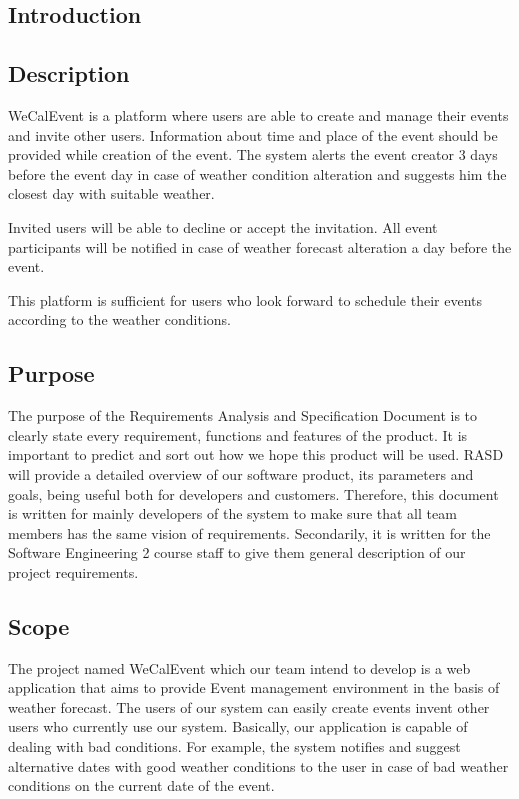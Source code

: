 \newpage
\begin{center}
\section{Introduction}
\end{center}

\subsection{Description}
\quad WeCalEvent is a platform where users are able to create and manage their events and invite other users. Information about time and place of the event should be provided while creation of the event. The system alerts the event creator 3 days before the event day in case of weather condition alteration and suggests him the closest day with suitable weather.
\par Invited users will be able to decline or accept the invitation. All event participants will be notified in case of weather forecast alteration a day before the event.
\par This platform is sufficient for users who look forward to schedule their events according to the weather conditions.

\subsection{Purpose}
\quad The purpose of the Requirements Analysis and Specification Document is to clearly state every requirement, functions and features of the product. It is important to predict and sort out how we hope this product will be used. RASD will provide a detailed overview of our software product, its parameters and goals, being useful both for developers and customers. Therefore, this document is written for mainly developers of the system to make sure that all team members has the same vision of requirements. Secondarily, it is written for the Software Engineering 2 course staff to give them general description of our project requirements.

\subsection{Scope}
\quad The project named WeCalEvent which our team intend to develop is a web application that aims to provide Event management environment in the basis of weather forecast. The users of our system can easily create events invent other users who currently use our system. Basically, our application is capable of dealing with bad conditions. For example, the system notifies and suggest alternative dates with good weather conditions to the user in case of bad weather conditions on the current date of the event.
